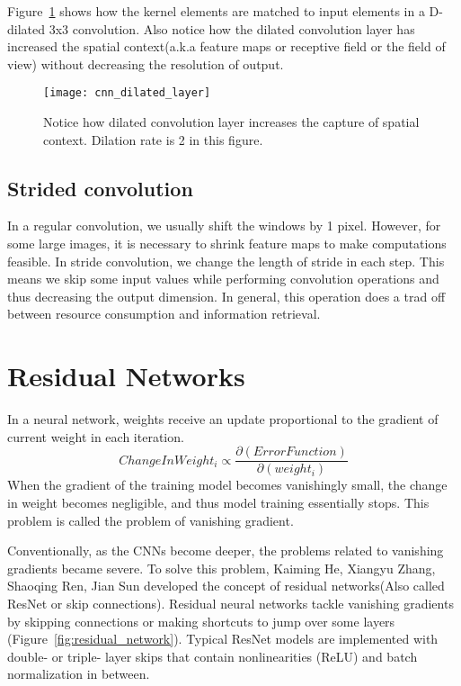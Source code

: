     Figure~\ref{fig:dilated_layer} shows how the kernel elements are matched to input elements in a D-dilated 3x3 convolution. Also notice how the dilated convolution layer has increased the spatial context(a.k.a feature maps or receptive field or the field of view) without decreasing the resolution of output.
    \begin{figure}[h!]
        \centering
        \texttt{[image: cnn\_dilated\_layer]}
        \caption[Dilated convolution layer]{Notice how dilated convolution layer increases the capture of spatial context. Dilation rate is 2 in this figure.}
        \label{fig:dilated_layer}
    \end{figure}


\subsection{Strided convolution}
    In a regular convolution, we usually shift the windows by 1 pixel. However, for some large images, it is necessary to shrink feature maps to make computations feasible. In stride convolution, we change the length of stride in each step. This means we skip some input values while performing convolution operations and thus decreasing the output dimension. In general, this operation does a trad off between resource consumption and information retrieval.


\section[Residual Networks]{Residual Networks}

In a neural network, weights receive an update proportional to the gradient of current weight in each iteration. \begin{equation} ChangeInWeight_{i} \propto \frac{\partial(ErrorFunction)}{\partial(weight_{i})} \end{equation} When the gradient of the training model becomes vanishingly small, the change in weight becomes negligible, and thus model training essentially stops. This problem is called the problem of vanishing gradient.

Conventionally, as the CNNs become deeper, the problems related to vanishing gradients became severe. To solve this problem, {Kaiming He, Xiangyu Zhang, Shaoqing Ren, Jian Sun}\cite{ResNet} developed the concept of residual networks(Also called ResNet or skip connections). Residual neural networks tackle vanishing gradients by skipping connections or making shortcuts to jump over some layers (Figure~\ref{fig:residual_network}). Typical ResNet models are implemented with double- or triple- layer skips that contain nonlinearities (ReLU) and batch normalization in between.

